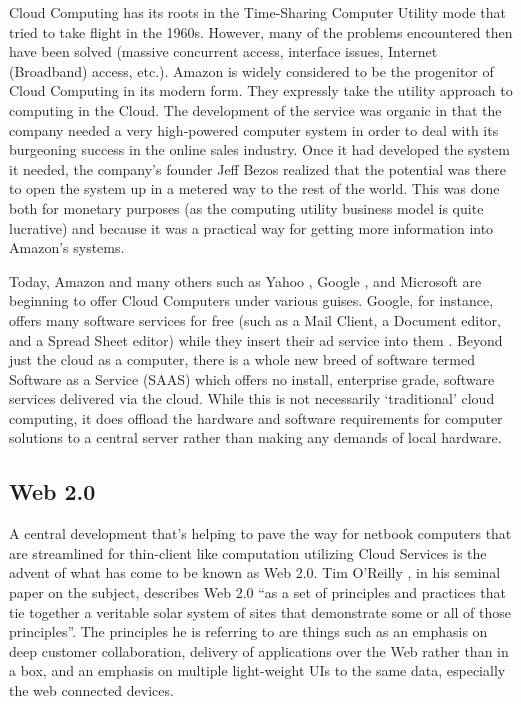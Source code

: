 Cloud Computing has its roots in the Time-Sharing Computer Utility mode that
tried to take flight in the 1960s.  However, many of the problems encountered
then have been solved (massive concurrent access, interface issues, Internet
(Broadband) access, etc.).  Amazon is widely considered to be the progenitor of
Cloud Computing in its modern form.  They expressly take the utility approach to
computing in the Cloud.  The development of the service was organic in that the
company needed a very high-powered computer system in order to deal with its
burgeoning success in the online sales industry.  Once it had developed the
system it needed, the company's founder Jeff Bezos realized that the potential
was there to open the system up in a metered way to the rest of the world.  This
was done both for monetary purposes (as the computing utility business model is
quite lucrative) and because it was a practical way for getting more information
into Amazon's systems.

Today, Amazon \citep{reiss2008} and many others such as Yahoo \citep{yahoo2009},
Google \citep{baker2007}, and Microsoft \citep{reiss2008} are beginning to offer
Cloud Computers under various guises.  Google, for instance, offers many
software services for free (such as a Mail Client, a Document editor, and a
Spread Sheet editor) while they insert their ad service into them
\citep{mcdougall2007}.  Beyond just the cloud as a computer, there is a whole
new breed of software termed Software as a Service (SAAS) which offers no
install, enterprise grade, software services delivered via the cloud.  While
this is not necessarily `traditional' cloud computing, it does offload the
hardware and software requirements for computer solutions to a central server
rather than making any demands of local hardware.

\subsection{Web 2.0}

A central development that's helping to pave the way for netbook computers that
are streamlined for thin-client like computation utilizing Cloud Services is the
advent of what has come to be known as Web 2.0.  Tim O'Reilly
\citeyearpar{oreilly2007}, in his seminal paper on the subject, describes Web
2.0 ``as a set of principles and practices that tie together a veritable solar
system of sites that demonstrate some or all of those principles''. The
principles he is referring to are things such as an emphasis on deep customer
collaboration, delivery of applications over the Web rather than in a box, and
an emphasis on multiple light-weight UIs to the same data, especially the web
connected devices.

